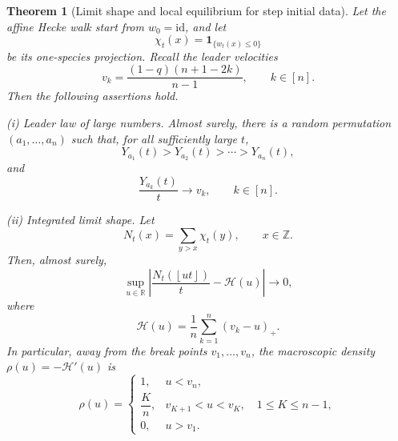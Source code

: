 \documentclass[10pt,a4paper]{amsart}
\newtheorem{theorem}{Theorem}
\newcommand{\R}{\mathbb R}
\newcommand{\Z}{\mathbb Z}
\newcommand{\abs}[1]{\left|#1\right|}
\newcommand{\cH}{\mathcal H}
\newcommand{\floor}[1]{\left\lfloor #1\right\rfloor}
\newcommand{\id}{\mathrm{id}}
\newcommand{\one}{\mathbf 1}
\newcommand{\pospart}[1]{\left(#1\right)_{+}}
\begin{document}
	\begin{theorem}[Limit shape and local equilibrium for step initial data]
		\label{thm:limit-shape-step}
		Let the affine Hecke walk start from $w_0=\id$, and let
		\begin{equation}\label{eq:chi-from-wt}
			\chi_t(x)=\one_{\{w_t(x)\le0\}}
		\end{equation}
		be its one-species projection.  Recall the leader velocities
		\begin{equation}\label{eq:theorem-velocities}
			v_k=\frac{(1-q)(n+1-2k)}{n-1},
			\qquad k\in[n].
		\end{equation}
		Then the following assertions hold.
		
		\smallskip
		\noindent\emph{(i) Leader law of large numbers.}
		Almost surely, there is a random permutation $(a_1,\ldots,a_n)$ such that,
		for all sufficiently large $t$,
		\begin{equation}\label{eq:eventual-leader-order}
			Y_{a_1}(t)>Y_{a_2}(t)>\cdots>Y_{a_n}(t),
		\end{equation}
		and
		\begin{equation}\label{eq:leader-velocity-limit}
			\frac{Y_{a_k}(t)}{t}\longrightarrow v_k,
			\qquad k\in[n].
		\end{equation}
		
		\smallskip
		\noindent\emph{(ii) Integrated limit shape.}
		Let
		\begin{equation}\label{eq:particle-count}
			N_t(x)=\sum_{y>x}\chi_t(y),
			\qquad x\in\Z.
		\end{equation}
		Then, almost surely,
		\begin{equation}\label{eq:uniform-height-limit}
			\sup_{u\in\R}
			\abs{\frac{N_t(\floor{ut})}{t}-\cH(u)}
			\longrightarrow0,
		\end{equation}
		where
		\begin{equation}\label{eq:limit-height-function}
			\cH(u)=\frac1n\sum_{k=1}^n\pospart{v_k-u}.
		\end{equation}
		In particular, away from the break points $v_1,\ldots,v_n$, the macroscopic
		density $\rho(u)=-\cH'(u)$ is
		\begin{equation}\label{eq:density-profile}
			\rho(u)=
			\begin{cases}
				1,&u<v_n,\\[1mm]
				\dfrac{K}{n},&v_{K+1}<u<v_K,
				\quad 1\le K\le n-1,\\[2mm]
				0,&u>v_1.
			\end{cases}
		\end{equation}
		

\end{theorem}
\end{document}

